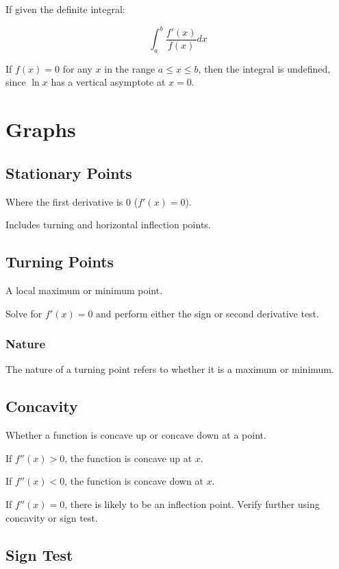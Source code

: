 \documentclass[a4paper,11pt]{article}
\begin{document}
If given the definite integral:

$$
\int_a^b \frac{f'(x)}{f(x)} dx
$$

If $f(x) = 0$ for any $x$ in the range $a \leq x \leq b$, then the integral is
undefined, since $\ln{x}$ has a vertical asymptote at $x = 0$.




\section{Graphs}

\subsection{Stationary Points}

Where the first derivative is 0 ($f'(x) = 0$).

Includes turning and horizontal inflection points.


\subsection{Turning Points}

A local maximum or minimum point.

Solve for $f'(x) = 0$ and perform either the sign or second derivative test.


\subsubsection{Nature}

The nature of a turning point refers to whether it is a maximum or minimum.


\subsection{Concavity}

Whether a function is concave up or concave down at a point.

If $f''(x) > 0$, the function is concave up at $x$.

If $f''(x) < 0$, the function is concave down at $x$.

If $f''(x) = 0$, there is likely to be an inflection point. Verify further using
concavity or sign test.


\subsection{Sign Test}
\end{document}
